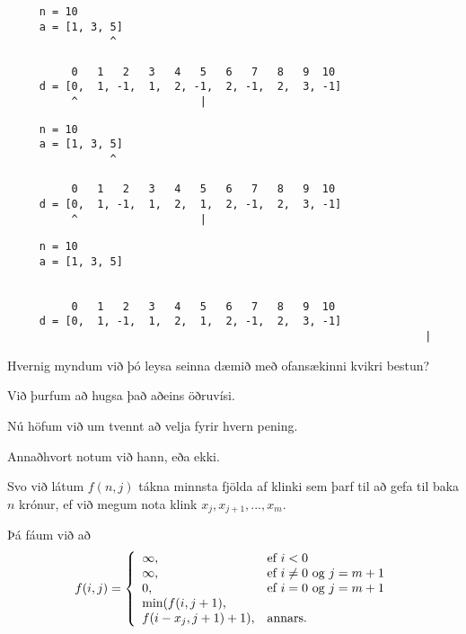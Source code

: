 \begin{frame}[fragile]
\begin{verbatim}
     n = 10
     a = [1, 3, 5]
                ^

          0   1   2   3   4   5   6   7   8   9  10
     d = [0,  1, -1,  1,  2, -1,  2, -1,  2,  3, -1]
          ^                   |
\end{verbatim}
\end{frame}
\addtocounter{framenumber}{-1}

\begin{frame}[fragile]
\begin{verbatim}
     n = 10
     a = [1, 3, 5]
                ^

          0   1   2   3   4   5   6   7   8   9  10
     d = [0,  1, -1,  1,  2,  1,  2, -1,  2,  3, -1]
          ^                   |
\end{verbatim}
\end{frame}
\addtocounter{framenumber}{-1}

\begin{frame}[fragile]
\begin{verbatim}
     n = 10
     a = [1, 3, 5]
                 

          0   1   2   3   4   5   6   7   8   9  10
     d = [0,  1, -1,  1,  2,  1,  2, -1,  2,  3, -1]
                                                                 |
\end{verbatim}
\end{frame}

{
	{
		\item<1-> Hvernig myndum við þó leysa seinna dæmið með ofansækinni kvikri bestun?
		\item<2-> Við þurfum að hugsa það aðeins öðruvísi.
		\item<3-> Nú höfum við um tvennt að velja fyrir hvern pening.
		\item<4-> Annaðhvort notum við hann, eða ekki.
		\item<5-> Svo við látum $f(n, j)$ tákna minnsta fjölda af klinki sem þarf til að gefa til baka $n$ krónur,
					ef við megum nota klink $x_j, x_{j + 1}, ..., x_m$.
		\item<6-> Þá fáum við að
		\[
			f(i, j) = \left \{
			\env{array}
			{
				{l l}
				\infty, & \text{ef $i < 0$}\\
				\infty, & \text{ef $i \neq 0$ og $j = m + 1$}\\
				0, & \text{ef $i = 0$ og $j = m + 1$}\\
				\text{min}(f(i, j + 1), &\\
				f(i - x_j, j + 1) + 1), & \text{annars.}\\
			}
			\right .
		\]
	}
}

